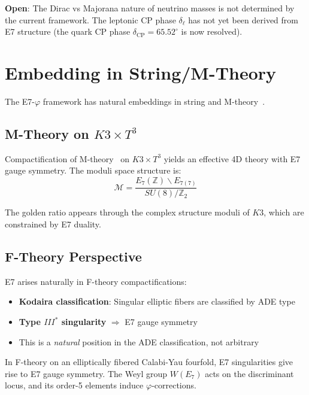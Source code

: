 \documentclass[11pt,a4paper]{article}
\begin{document}
\textbf{Open}: The Dirac vs Majorana nature of neutrino masses is not determined by the current framework. The leptonic CP phase $\delta_{\ell}$ has not yet been derived from E7 structure (the quark CP phase $\delta_{\text{CP}} = 65.52^\circ$ is now resolved).

\section{Embedding in String/M-Theory}

The E7-$\varphi$ framework has natural embeddings in string and M-theory~\cite{Witten1995,Cremmer1979}.

\subsection{M-Theory on $K3 \times T^3$}

Compactification of M-theory~\cite{Witten1995} on $K3 \times T^3$ yields an effective 4D theory with E7 gauge symmetry. The moduli space structure is:
\begin{equation}
\mathcal{M} = \frac{E_7(\mathbb{Z}) \backslash E_{7(7)}}{SU(8)/\mathbb{Z}_2}
\end{equation}

The golden ratio appears through the complex structure moduli of $K3$, which are constrained by E7 duality.

\subsection{F-Theory Perspective}

E7 arises naturally in F-theory compactifications:
\begin{itemize}
\item \textbf{Kodaira classification}: Singular elliptic fibers are classified by ADE type
\item \textbf{Type $III^*$ singularity} $\Rightarrow$ E7 gauge symmetry
\item This is a \textit{natural} position in the ADE classification, not arbitrary
\end{itemize}

In F-theory on an elliptically fibered Calabi-Yau fourfold, E7 singularities give rise to E7 gauge symmetry. The Weyl group $W(E_7)$ acts on the discriminant locus, and its order-5 elements induce $\varphi$-corrections.
\end{document}
